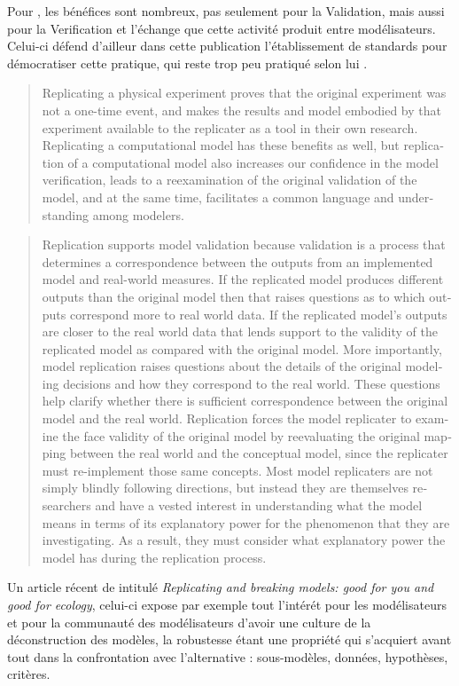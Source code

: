 Pour \textcite{Wilensky2007a}, les bénéfices sont nombreux, pas seulement pour la Validation, mais aussi pour la Verification  et l'échange que cette activité produit entre modélisateurs. Celui-ci défend d'ailleur dans cette publication l'établissement de standards pour démocratiser cette pratique, qui reste trop peu pratiqué selon lui .

\foreignblockquote{english}[\cite{Wilensky2007a}]{Replicating a physical experiment proves that the original experiment was not a one-time event, and makes the results and model embodied by that experiment available to the replicater as a tool in their own research. Replicating a computational model has these benefits as well, but replication of a computational model also increases our confidence in the model verification, leads to a reexamination of the original validation of the model, and at the same time, facilitates a common language and understanding among modelers.}

\foreignblockquote{english}[\cite{Wilensky2007a}]{Replication supports model validation because validation is a process that determines a correspondence between the outputs from an implemented model and real-world measures. If the replicated model produces different outputs than the original model then that raises questions as to which outputs correspond more to real world data. If the replicated model's outputs are closer to the real world data that lends support to the validity of the replicated model as compared with the original model. More importantly, model replication raises questions about the details of the original modeling decisions and how they correspond to the real world. These questions help clarify whether there is sufficient correspondence between the original model and the real world. Replication forces the model replicater to examine the face validity of the original model by reevaluating the original mapping between the real world and the conceptual model, since the replicater must re-implement those same concepts. Most model replicaters are not simply blindly following directions, but instead they are themselves researchers and have a vested interest in understanding what the model means in terms of its explanatory power for the phenomenon that they are investigating. As a result, they must consider what explanatory power the model has during the replication process.}

Un article récent de \textcite{Thiele2015} intitulé \textit{Replicating and breaking models: good for you and good for ecology}, celui-ci expose par exemple tout l'intérét pour les modélisateurs et pour la communauté des modélisateurs d'avoir une culture de la déconstruction des modèles, la robustesse étant une propriété qui s'acquiert avant tout dans la confrontation avec l'alternative : sous-modèles, données, hypothèses, critères.

